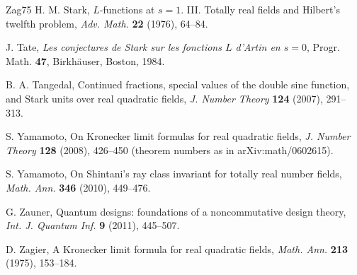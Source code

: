 \documentclass[11pt]{amsart}
\numberwithin{equation}{section}
\theoremstyle{plain}
\theoremstyle{definition}
\theoremstyle{remark}
\begin{document}
\begin{thebibliography}{Zag75}
 H. M. Stark, $L$-functions at $s=1$. III. Totally real fields and Hilbert's twelfth problem, \emph{Adv. Math.} \textbf{22} (1976), 64--84.

 J. Tate, \emph{Les conjectures de Stark sur les fonctions $L$ d'Artin en $s=0$}, Progr. Math. \textbf{47}, Birkhäuser, Boston, 1984.

 B. A. Tangedal, Continued fractions, special values of the double sine function, and Stark units over real quadratic fields, \emph{J. Number Theory} \textbf{124} (2007), 291--313.

 S. Yamamoto, On Kronecker limit formulas for real quadratic fields, \emph{J. Number Theory} \textbf{128} (2008), 426--450 (theorem numbers as in arXiv:math/0602615).

 S. Yamamoto, On Shintani's ray class invariant for totally real number fields, \emph{Math. Ann.} \textbf{346} (2010), 449--476.

 G. Zauner, Quantum designs: foundations of a noncommutative design theory, \emph{Int. J. Quantum Inf.} \textbf{9} (2011), 445--507.

 D. Zagier, A Kronecker limit formula for real quadratic fields, \emph{Math. Ann.} \textbf{213} (1975), 153--184.

\end{thebibliography}
\end{document}
